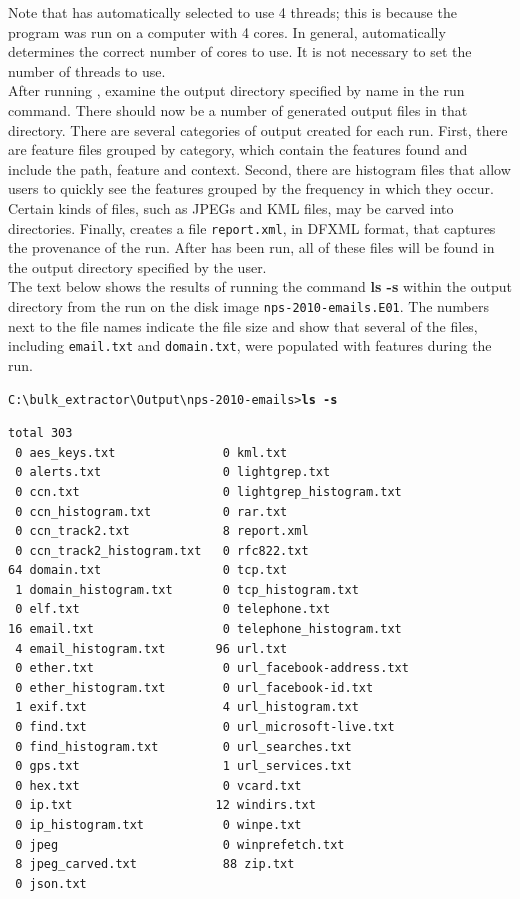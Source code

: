 \documentclass[11pt]{article} %
\begin{document}
Note that \bulk has automatically selected to use 4 threads; this is because the program was run on a computer with 4 cores. In general, \bulk automatically determines the correct number of cores to use. It is not necessary to set the number of threads to use.\\

After running \bulk, examine the output directory specified by name in the run command. There should now be a number of generated output files in that directory. There are several categories of output created for each \bulk run. First, there are feature files grouped by category, which contain the features found and include the path, feature and context. Second, there are histogram files that allow users to quickly see the features grouped by the frequency in which they occur. Certain kinds of files, such as JPEGs and KML files, may be carved into directories. Finally, \bulk creates a file \texttt{report.xml}, in DFXML format, that captures the provenance of the run. After \bulk has been run, all of these files will be found in the output directory specified by the user.\\

The text below shows the results of running the command \textbf{ls -s} within the output directory from the \bulk run on the disk image \texttt{nps-2010-emails.E01}. The numbers next to the file names indicate the file size and show that several of the files, including \texttt{email.txt} and \texttt{domain.txt}, were populated with features during the run.

\begingroup
\footnotesize
\texttt{C:\textbackslash bulk\_extractor\textbackslash Output\textbackslash nps-2010-emails\textgreater \textbf{ls -s}}
\endgroup
\begingroup
\footnotesize
\begin{Verbatim}[fontfamily=courier]
total 303
 0 aes_keys.txt               0 kml.txt
 0 alerts.txt                 0 lightgrep.txt
 0 ccn.txt                    0 lightgrep_histogram.txt
 0 ccn_histogram.txt          0 rar.txt
 0 ccn_track2.txt             8 report.xml
 0 ccn_track2_histogram.txt   0 rfc822.txt
64 domain.txt                 0 tcp.txt
 1 domain_histogram.txt       0 tcp_histogram.txt
 0 elf.txt                    0 telephone.txt
16 email.txt                  0 telephone_histogram.txt
 4 email_histogram.txt       96 url.txt
 0 ether.txt                  0 url_facebook-address.txt
 0 ether_histogram.txt        0 url_facebook-id.txt
 1 exif.txt                   4 url_histogram.txt
 0 find.txt                   0 url_microsoft-live.txt
 0 find_histogram.txt         0 url_searches.txt
 0 gps.txt                    1 url_services.txt
 0 hex.txt                    0 vcard.txt
 0 ip.txt                    12 windirs.txt
 0 ip_histogram.txt           0 winpe.txt
 0 jpeg                       0 winprefetch.txt
 8 jpeg_carved.txt            88 zip.txt
 0 json.txt
\end{Verbatim}
\endgroup
\end{document}
